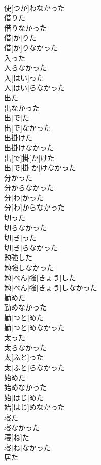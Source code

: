 \documentclass[8pt]{extreport}
\begin{document}
\begin{CJK}{UTF8}{min}
\\	使[つか]わなかった
\\	借りた 
\\	借りなかった	
\\	借[か]りた 
\\	借[か]りなかった
\\	入った 
\\	入らなかった	
\\	入[はい]った 
\\	入[はい]らなかった
\\	出た 
\\	出なかった	
\\	出[で]た 
\\	出[で]なかった
\\	出掛けた 
\\	出掛けなかった	
\\	出[で]掛[か]けた 
\\	出[で]掛[か]けなかった
\\	分かった 
\\	分からなかった	
\\	分[わ]かった 
\\	分[わ]からなかった
\\	切った 
\\	切らなかった	
\\	切[き]った 
\\	切[き]らなかった
\\	勉強した 
\\	勉強しなかった	
\\	勉[べん]強[きょう]した 
\\	勉[べん]強[きょう]しなかった
\\	勤めた 
\\	勤めなかった	
\\	勤[つと]めた 
\\	勤[つと]めなかった
\\	太った 
\\	太らなかった	
\\	太[ふと]った 
\\	太[ふと]らなかった
\\	始めた 
\\	始めなかった	
\\	始[はじ]めた 
\\	始[はじ]めなかった
\\	寝た 
\\	寝なかった	
\\	寝[ね]た 
\\	寝[ね]なかった
\\	居た 

\end{CJK}
\end{document}
